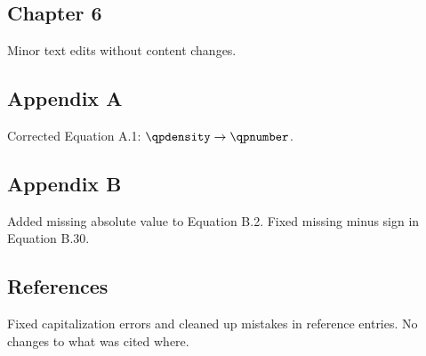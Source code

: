 \subsection*{Chapter 6}
Minor text edits without content changes.

\subsection*{Appendix A}
Corrected Equation A.1: $\qpdensity \rightarrow \qpnumber$.

\subsection*{Appendix B}
Added missing absolute value to Equation B.2.
Fixed missing minus sign in Equation B.30.

\subsection*{References}
Fixed capitalization errors and cleaned up mistakes in reference entries.
No changes to what was cited where.
